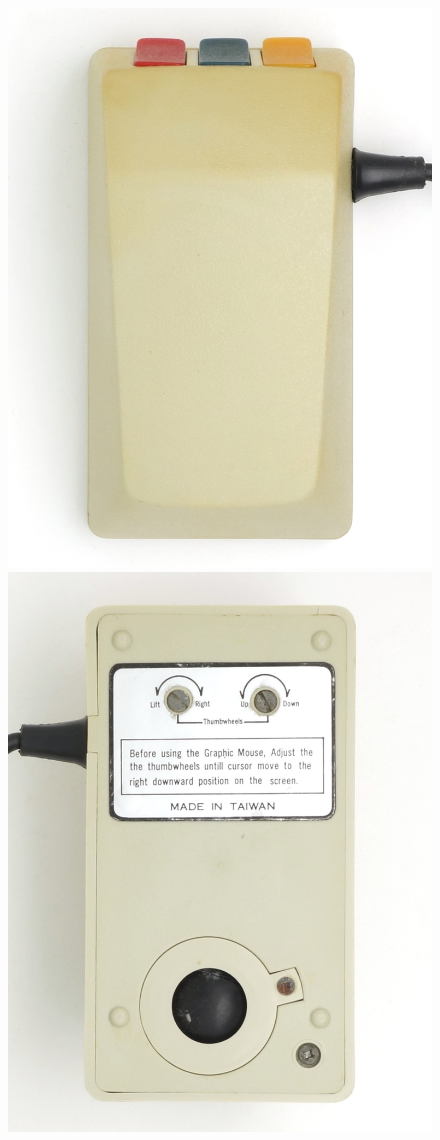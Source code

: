 \documentclass[11pt, a4paper]{article}
\begin{document}
\begin{figure}[h]
    \centering
    \includegraphics[scale=0.75]{1985_smc_contriver_magic_mouse/top_30.jpg}
    \includegraphics[scale=0.75]{1985_smc_contriver_magic_mouse/bottom_30.jpg}

\end{figure}
\end{document}

